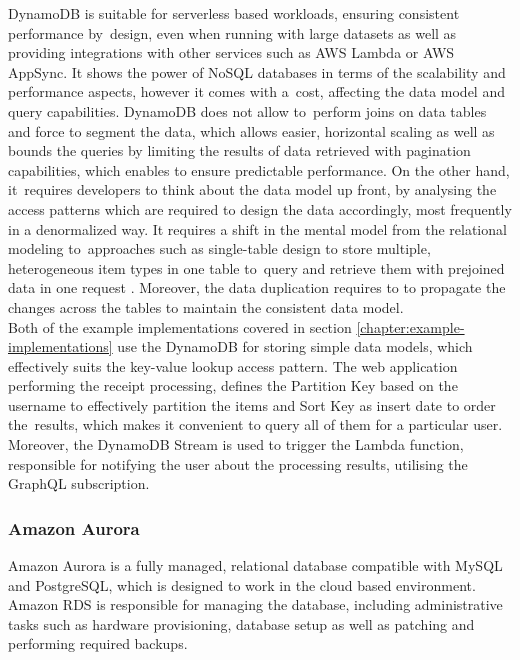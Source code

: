 DynamoDB is suitable for serverless based workloads, ensuring consistent performance by~design, even when running with large datasets as well as providing integrations with other services such as AWS Lambda or AWS AppSync.
It shows the power of NoSQL databases in terms of the scalability and performance aspects, however it comes with a~cost, affecting the data model and query capabilities.
DynamoDB does not allow to~perform joins on data tables and force to segment the data, which allows easier, horizontal scaling as well as bounds the queries by limiting the results of data retrieved with pagination capabilities, which enables to ensure predictable performance.
On the other hand, it~requires developers to think about the data model up front, by analysing the access patterns which are required to design the data accordingly, most frequently in a denormalized way.
It requires a shift in the mental model from the relational modeling to~approaches such as single-table design to store multiple, heterogeneous item types in one table to~query and retrieve them with prejoined data in one request \cite{SQLNoSQLandScaleHowDynamoDBScalesWhereRelationalDatabasesDont}.
Moreover, the data duplication requires to to propagate the changes across the tables to maintain the consistent data model. \\

Both of the example implementations covered in section \ref{chapter:example-implementations} use the DynamoDB for storing simple data models, which effectively suits the key-value lookup access pattern.
The web application performing the receipt processing, defines the Partition Key based on the username to effectively partition the items and Sort Key as insert date to order the~results, which makes it convenient to query all of them for a particular user.
Moreover, the DynamoDB Stream is used to trigger the Lambda function, responsible for notifying the user about the processing results, utilising the GraphQL subscription.

\subsubsection{Amazon Aurora}

Amazon Aurora \cite{Aurora} is a fully managed, relational database compatible with MySQL and PostgreSQL, which is designed to work in the cloud based environment.
Amazon RDS is responsible for managing the database, including administrative tasks such as hardware provisioning, database setup as well as patching and performing required backups.

